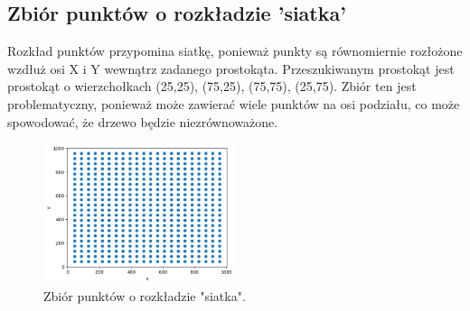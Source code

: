 \documentclass{lab}
\begin{document}
\subsection{Zbiór punktów o rozkładzie 'siatka'}
Rozkład punktów przypomina siatkę, ponieważ punkty są równomiernie rozłożone wzdłuż osi X i Y wewnątrz zadanego prostokąta.
Przeszukiwanym prostokąt jest prostokąt o wierzchołkach (25,25), (75,25), (75,75), (25,75).
Zbiór ten jest problematyczny, ponieważ może zawierać wiele punktów na osi podziału, co może spowodować, że drzewo będzie niezrównoważone.

\begin{figure}[H]
  \centering
  \includegraphics[width=0.5\textwidth]{resources/grid.png}
  \caption{Zbiór punktów o rozkładzie "siatka".}
  \label{fig:grid}
\end{figure}
\end{document}
